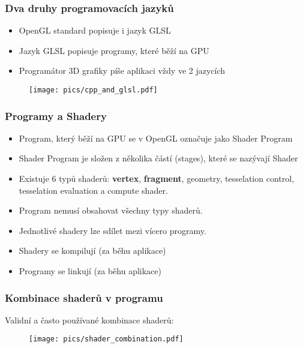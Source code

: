 
\begin{frame}
\frametitle{Dva druhy programovacích jazyků}
   \begin{itemize}
    \item OpenGL standard popisuje i jazyk GLSL
    \item Jazyk GLSL popisuje programy, které běží na GPU
    \item Programátor 3D grafiky píše aplikaci vždy ve 2 jazycích
  \end{itemize}
  \begin{figure}[h]
    \texttt{[image: pics/cpp\_and\_glsl.pdf]}
  \end{figure}
\end{frame}

\begin{frame}
\frametitle{Programy a Shadery}
  \begin{itemize}
  \item Program, který běží na GPU se v OpenGL označuje jako Shader Program
  \item Shader Program je složen z několika částí (stages), které se nazývají Shader
  \item Existuje 6 typů shaderů: \textbf{vertex}, \textbf{fragment}, geometry, tesselation control, tesselation evaluation a compute shader.
  \item Program nemusí obsahovat všechny typy shaderů.
  \item Jednotlivé shadery lze sdílet mezi vícero programy.
  \item Shadery se kompilují (za běhu aplikace)
  \item Programy se linkují (za běhu aplikace)
  \end{itemize}
\end{frame}

\begin{frame}
\frametitle{Kombinace shaderů v programu}
  Validní a často používané kombinace shaderů:
  \begin{figure}[h]
    \texttt{[image: pics/shader\_combination.pdf]}
  \end{figure}
\end{frame}

